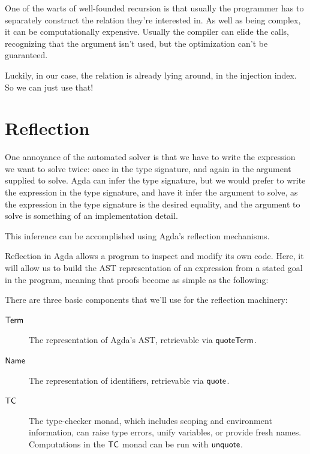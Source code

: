 \documentclass[draft, twocolumn]{article}
\theoremstyle{definition}
\theoremstyle{definition}
\begin{document}
One of the warts of well-founded recursion is that usually the programmer has to
separately construct the relation they're interested in. As well as being
complex, it can be computationally expensive. Usually the compiler can elide the
calls, recognizing that the argument isn't used, but the optimization can't be
guaranteed.

Luckily, in our case, the relation is already lying around, in the injection
index. So we can just use that!

\section{Reflection} \label{reflection}
One annoyance of the automated solver is that we have to write the expression we
want to solve twice: once in the type signature, and again in the argument
supplied to solve. Agda can infer the type signature, but we would prefer to
write the expression in the type signature, and have it infer the argument to
solve, as the expression in the type signature is the desired equality, and the
argument to solve is something of an implementation detail. 

This inference can be accomplished using Agda's reflection
mechanisms\cite{van_der_walt_reflection_2012}.

Reflection in Agda allows a program to inspect and modify its own code. Here, it
will allow us to build the AST representation of an expression from a stated
goal in the program, meaning that proofs become as simple as the following:

There are three basic components that we'll use for the reflection machinery:
\begin{description}
  \item[\(\AgdaDatatype{Term}\)] The representation of Agda's AST, retrievable
    via \(\AgdaKeyword{quoteTerm}\).
  \item[\(\AgdaDatatype{Name}\)] The representation of identifiers, retrievable
    via \(\AgdaKeyword{quote}\).
  \item[\(\AgdaDatatype{TC}\)] The type-checker monad, which includes scoping
    and environment information, can raise type errors, unify variables, or
    provide fresh names. Computations in the \(\AgdaDatatype{TC}\) monad can be
    run with \(\AgdaKeyword{unquote}\).
\end{description}
\end{document}
